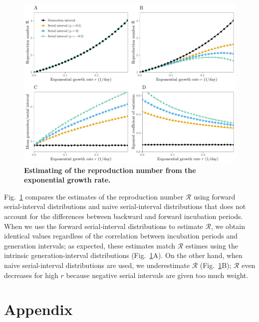 \documentclass[12pt]{article}
\newcommand{\fref}[1]{Fig.~\ref{fig:#1}}
\begin{document}
\begin{figure}[!ht]
\includegraphics[width=\textwidth]{rR.pdf}
\caption{
\textbf{Estimating of the reproduction number from the exponential growth rate.}
}
\label{fig:rR}
\end{figure}

\fref{rR} compares the estimates of the reproduction number $\mathcal R$ using forward serial-interval distributions and naive serial-interval distributions that does not account for the differences between backward and forward incubation periods.
When we use the forward serial-interval distributions to estimate $\mathcal R$, we obtain identical values regardless of the correlation between incubation periods and generation intervals;
as expected, these estimates match $\mathcal R$ estimes using the intrinsic generation-interval distributions (\fref{rR}A).
On the other hand, when naive serial-interval distributions are used, we underestimate $\mathcal R$ (\fref{rR}B); $\mathcal R$ even decreases for high $r$ because negative serial intervals are given too much weight.



\section{Appendix}
\end{document}
